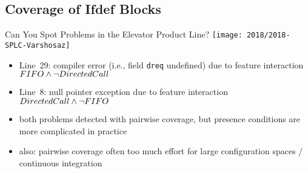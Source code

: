 \subsection{Coverage of Ifdef Blocks}
\begin{frame}[b]
	\begin{example}{Can You Spot Problems in the Elevator Product Line?\mysource{\samplingsurvey}}
		\centering\texttt{[image: 2018/2018-SPLC-Varshosaz]}
	\end{example}
	\pause
	\begin{itemize}
		\item<+-> Line~29: compiler error (i.e., field \texttt{dreq} undefined) %
		due to feature interaction $FIFO \wedge \neg DirectedCall$
		\item<+-> Line~8: null pointer exception %
		due to feature interaction $DirectedCall \wedge \neg FIFO$
		\item<+-> both problems detected with pairwise coverage, but presence conditions are more complicated in practice
		\item<+-> also: pairwise coverage often too much effort for large configuration spaces / continuous integration
	\end{itemize}
\end{frame}

